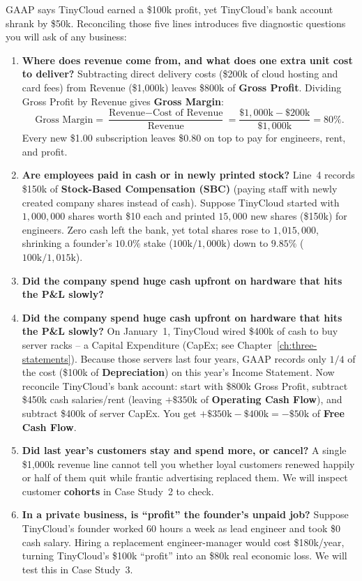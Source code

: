 GAAP says TinyCloud earned a \$100k profit, yet TinyCloud's bank account shrank by \$50k. Reconciling those five lines introduces five diagnostic questions you will ask of any business:

\begin{enumerate}
  \item \textbf{Where does revenue come from, and what does one extra unit cost to deliver?}
  Subtracting direct delivery costs (\$200k of cloud hosting and card fees) from Revenue (\$1,000k) leaves \$800k of \textbf{Gross Profit}. Dividing Gross Profit by Revenue gives \textbf{Gross Margin}:
  \[
    \text{Gross Margin} = \frac{\text{Revenue} - \text{Cost of Revenue}}{\text{Revenue}} = \frac{\$1{,}000\text{k} - \$200\text{k}}{\$1{,}000\text{k}} = 80\%.
  \]
  Every new \$1.00 subscription leaves \$0.80 on top to pay for engineers, rent, and profit.
  \item \textbf{Are employees paid in cash or in newly printed stock?}
  Line~4 records \$150k of \textbf{Stock-Based Compensation (SBC)} (paying staff with newly created company shares instead of cash). Suppose TinyCloud started with $1{,}000{,}000$ shares worth \$10 each and printed $15{,}000$ new shares (\$150k) for engineers. Zero cash left the bank, yet total shares rose to $1{,}015{,}000$, shrinking a founder's $10.0\%$ stake ($100\text{k}/1{,}000\text{k}$) down to $9.85\%$ ($100\text{k}/1{,}015\text{k}$).
  \item \textbf{Did the company spend huge cash upfront on hardware that hits the P\&L slowly?}
  \item \textbf{Did the company spend huge cash upfront on hardware that hits the P\&L slowly?}
  On January~1, TinyCloud wired \$400k of cash to buy server racks -- a Capital Expenditure (CapEx; see Chapter~\ref{ch:three-statements}). Because those servers last four years, GAAP records only $1/4$ of the cost (\$100k of \textbf{Depreciation}) on this year's Income Statement. Now reconcile TinyCloud's bank account: start with \$800k Gross Profit, subtract \$450k cash salaries/rent (leaving $+\$350\text{k}$ of \textbf{Operating Cash Flow}), and subtract \$400k of server CapEx. You get $+\$350\text{k} - \$400\text{k} = -\$50\text{k}$ of \textbf{Free Cash Flow}.
  \item \textbf{Did last year's customers stay and spend more, or cancel?}
  A single \$1,000k revenue line cannot tell you whether loyal customers renewed happily or half of them quit while frantic advertising replaced them. We will inspect customer \textbf{cohorts} in Case Study~2 to check.
  \item \textbf{In a private business, is ``profit'' the founder's unpaid job?}
  Suppose TinyCloud's founder worked $60$ hours a week as lead engineer and took \$0 cash salary. Hiring a replacement engineer-manager would cost \$180k/year, turning TinyCloud's \$100k ``profit'' into an \$80k real economic loss. We will test this in Case Study~3.
\end{enumerate}

